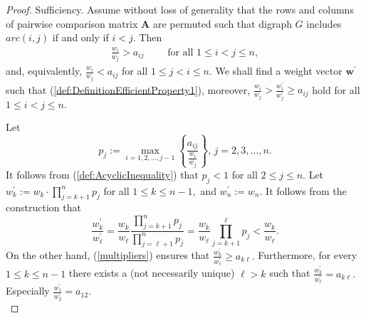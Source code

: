 \documentclass{article}
\theoremstyle{plain}
\begin{document}
\begin{proof}
Suf{\kern0pt}f{\kern0pt}iciency. Assume without loss of generality that the rows and columns of pairwise comparison matrix $\mathbf{A}$
are permuted such that digraph $G$ includes $arc(i,j)$ if and only if $i < j.$
Then
\begin{align}
\frac{w_i}{w_j} > a_{ij} \qquad \text{ for all } 1 \leq i < j \leq n,
\label{def:AcyclicInequality}    %
\end{align}
and, equivalently, $\frac{w_i}{w_j} < a_{ij} $ for all
$ 1 \leq j < i \leq n.$ We shall f{\kern0pt}ind a weight vector
$\mathbf{w}^{\prime}$ such that
(\ref{def:DefinitionEfficientProperty1}), moreover,
$\frac{w_i}{w_j} > \frac{w^{\prime}_i}{w^{\prime}_j} \geq a_{ij} $
hold for all $ 1 \leq i < j \leq n.$

Let
\begin{equation}
p_j := \underset{i=1,2,\ldots,j-1}{\max} \left\{  \frac{a_{ij}}{\frac{w_i}{w_j}} \right\},
\, j=2,3,\ldots,n. \label{multipliers}    %
\end{equation}
It follows from (\ref{def:AcyclicInequality}) that
$ p_j < 1$  for all $ 2 \leq j \leq n.$
Let ${w}^{\prime}_k := w_k \cdot \prod\limits_{j=k+1}^{n} p_j$
for all $ 1 \leq k \leq n-1,$ and ${w}^{\prime}_n := w_n.$
It follows from the construction that
\[
\frac{{w}^{\prime}_k}{{w}^{\prime}_{\ell}} =
\frac{w_k}{w_{\ell}} \frac{\prod\limits_{j=k+1}^{n} p_j}{\prod\limits_{j=\ell+1}^{n} p_j} =
\frac{w_k}{w_{\ell}} \prod\limits_{j=k+1}^{\ell} p_j < \frac{w_k}{w_{\ell}}.
\]
On the other hand, (\ref{multipliers}) ensures that $\frac{{w}^{\prime}_k}{{w}^{\prime}_{\ell}} \geq a_{k\ell}.$
Furthermore, for every $ 1 \leq k \leq n-1$  there exists a (not necessarily unique) $\ell > k$ such that
$\frac{{w}^{\prime}_k}{{w}^{\prime}_{\ell}} = a_{k\ell}.$
Especially $\frac{{w}^{\prime}_1}{{w}^{\prime}_{2}} = a_{12}.$
\\



\end{proof}
\end{document}
